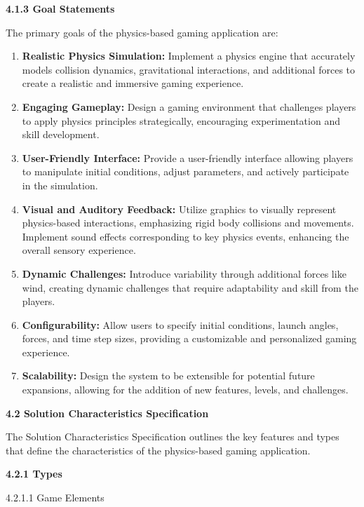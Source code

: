 \documentclass[
]{article}
\begin{document}
\textbf{4.1.3 Goal Statements}

The primary goals of the physics-based gaming application are:

\begin{enumerate}
\def\labelenumi{\arabic{enumi}.}
\item
  \textbf{Realistic Physics Simulation:} Implement a physics engine that
  accurately models collision dynamics, gravitational interactions, and
  additional forces to create a realistic and immersive gaming
  experience.
\item
  \textbf{Engaging Gameplay:} Design a gaming environment that
  challenges players to apply physics principles strategically,
  encouraging experimentation and skill development.
\item
  \textbf{User-Friendly Interface:} Provide a user-friendly interface
  allowing players to manipulate initial conditions, adjust parameters,
  and actively participate in the simulation.
\item
  \textbf{Visual and Auditory Feedback:} Utilize graphics to visually
  represent physics-based interactions, emphasizing rigid body
  collisions and movements. Implement sound effects corresponding to key
  physics events, enhancing the overall sensory experience.
\item
  \textbf{Dynamic Challenges:} Introduce variability through additional
  forces like wind, creating dynamic challenges that require
  adaptability and skill from the players.
\item
  \textbf{Configurability:} Allow users to specify initial conditions,
  launch angles, forces, and time step sizes, providing a customizable
  and personalized gaming experience.
\item
  \textbf{Scalability:} Design the system to be extensible for potential
  future expansions, allowing for the addition of new features, levels,
  and challenges.
\end{enumerate}

\textbf{4.2 Solution Characteristics Specification}

The Solution Characteristics Specification outlines the key features and
types that define the characteristics of the physics-based gaming
application.

\textbf{4.2.1 Types}

4.2.1.1 Game Elements
\end{document}

